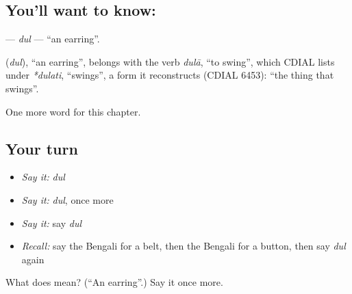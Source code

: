 \subsection*{You'll want to know: }
\textbf{} — \emph{dul} — \textquotedblleft{}an earring\textquotedblright{}.

\begin{cousinweb}
\textbf{} (\emph{dul}), \textquotedblleft{}an earring\textquotedblright{}, belongs with the verb \emph{dulā}, \textquotedblleft{}to swing\textquotedblright{}, which CDIAL lists under \emph{*dulati}, \textquotedblleft{}swings\textquotedblright{}, a form it reconstructs (CDIAL 6453): \textquotedblleft{}the thing that swings\textquotedblright{}.
\end{cousinweb}

\begin{grammarlens}[title={What you've built}]
One more word for this chapter.
\end{grammarlens}

\subsection*{Your turn}
\begin{itemize}
\raggedright
  \item \emph{Say it:} \emph{dul}
  \item \emph{Say it:} \emph{dul}, once more
  \item \emph{Say it:} say \emph{dul}
  \item \emph{Recall:} say the Bengali for a belt, then the Bengali for a button, then say \emph{dul} again
\end{itemize}

\begin{tcolorbox}[breakable,colback=teal!4,colframe=teal!35!black,title={Before you move on}]
What does  mean? (\textquotedblleft{}An earring\textquotedblright{}.) Say it once more.
\end{tcolorbox}
